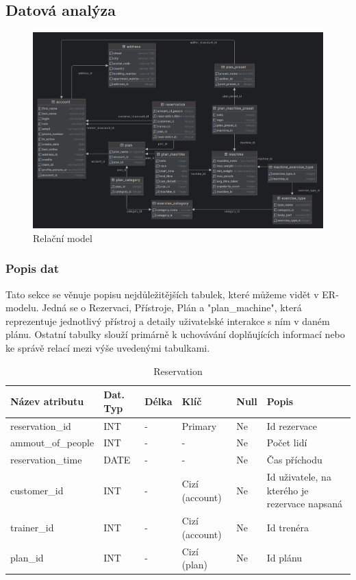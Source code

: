 \subsection{Datová analýza}

\begin{figure}[h!]
	\includegraphics[width=1\textwidth]{Figures/ermodel.png}
	\caption{ Relační model}
	\label{fig:RelationalModel}
\end{figure}

\subsubsection{Popis dat}
Tato sekce se věnuje popisu nejdůležitějších tabulek, které můžeme vidět v ER-modelu. Jedná se o Rezervaci, Přístroje, Plán a "plan\_machine", která reprezentuje jednotlivý přístroj a detaily uživatelské interakce s ním v daném plánu. Ostatní tabulky slouží primárně k uchovávání doplňujících informací nebo ke správě relací mezi výše uvedenými tabulkami.

\begin{table}[h!]
	\caption{Reservation}
    \label{tab:dat-dictionary-reservation}
	\begin{tabular}{|p{3.5cm}|p{2cm}|p{1cm}|p{2.5cm}|p{.75cm}|p{3.75cm}|}
		\hline
        \textbf{Název atributu} & \textbf{Dat. Typ} & \textbf{Délka} & \textbf{Klíč} & \textbf{Null} & \textbf{Popis} \\
        \hline
        reservation\_id & INT & - & Primary & Ne & Id rezervace \\
        \hline
        ammout\_of\_people & INT & - & - & Ne & Počet lidí \\
        \hline
        reservation\_time & DATE & - & - & Ne & Čas příchodu \\
        \hline
        customer\_id & INT & - & Cizí (account) & Ne & Id uživatele, na kterého je rezervace napsaná \\
        \hline
        trainer\_id & INT & - & Cizí (account) & Ne & Id trenéra \\
        \hline
        plan\_id & INT & - & Cizí (plan) & Ne & Id plánu \\
        \hline
	\end{tabular}
\end{table}

